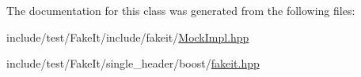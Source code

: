 The documentation for this class was generated from the following files\+:\begin{DoxyCompactItemize}
\item 
include/test/\+Fake\+It/include/fakeit/\mbox{\hyperlink{MockImpl_8hpp}{Mock\+Impl.\+hpp}}\item 
include/test/\+Fake\+It/single\+\_\+header/boost/\mbox{\hyperlink{single__header_2boost_2fakeit_8hpp}{fakeit.\+hpp}}\end{DoxyCompactItemize}
